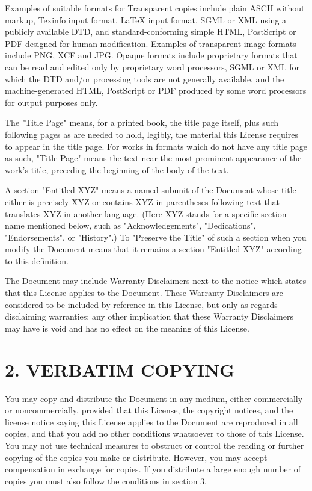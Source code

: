 \documentclass{book}
\begin{document}
Examples of suitable formats for Transparent copies include plain
ASCII without markup, Texinfo input format, LaTeX input format, SGML
or XML using a publicly available DTD, and standard-conforming simple
HTML, PostScript or PDF designed for human modification. Examples of
transparent image formats include PNG, XCF and JPG. Opaque formats
include proprietary formats that can be read and edited only by
proprietary word processors, SGML or XML for which the DTD and/or
processing tools are not generally available, and the
machine-generated HTML, PostScript or PDF produced by some word
processors for output purposes only.

The "Title Page" means, for a printed book, the title page itself,
plus such following pages as are needed to hold, legibly, the material
this License requires to appear in the title page. For works in
formats which do not have any title page as such, "Title Page" means
the text near the most prominent appearance of the work's title,
preceding the beginning of the body of the text.

A section "Entitled XYZ" means a named subunit of the Document whose
title either is precisely XYZ or contains XYZ in parentheses following
text that translates XYZ in another language. (Here XYZ stands for a
specific section name mentioned below, such as "Acknowledgements",
"Dedications", "Endorsements", or "History".) To "Preserve the Title"
of such a section when you modify the Document means that it remains a
section "Entitled XYZ" according to this definition.

The Document may include Warranty Disclaimers next to the notice which
states that this License applies to the Document. These Warranty
Disclaimers are considered to be included by reference in this
License, but only as regards disclaiming warranties: any other
implication that these Warranty Disclaimers may have is void and has
no effect on the meaning of this License.

\section*{2. VERBATIM COPYING}

You may copy and distribute the Document in any medium, either
commercially or noncommercially, provided that this License, the
copyright notices, and the license notice saying this License applies
to the Document are reproduced in all copies, and that you add no
other conditions whatsoever to those of this License. You may not use
technical measures to obstruct or control the reading or further
copying of the copies you make or distribute. However, you may accept
compensation in exchange for copies. If you distribute a large enough
number of copies you must also follow the conditions in section 3.
\end{document}

